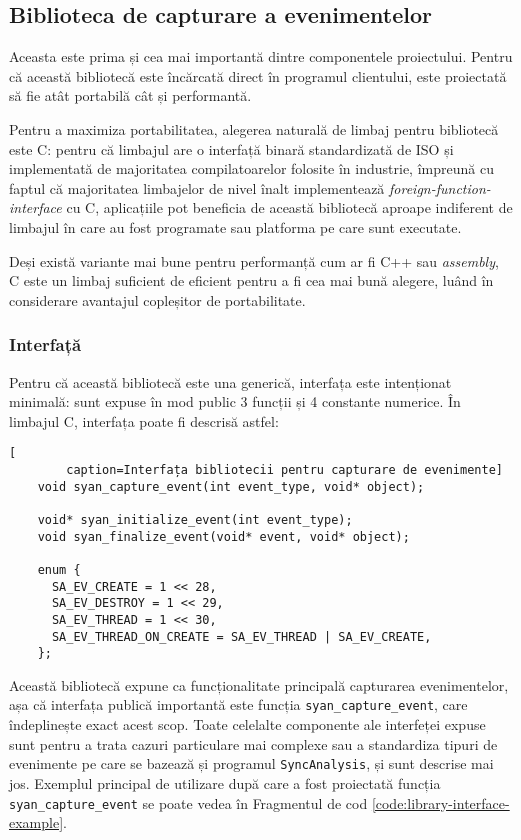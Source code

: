 \subsection{Biblioteca de capturare a evenimentelor}\label{library}
Aceasta este prima și cea mai importantă dintre componentele
proiectului. Pentru că această bibliotecă este încărcată direct în
programul clientului, este proiectată să fie atât portabilă cât și
performantă.

Pentru a maximiza portabilitatea, alegerea naturală de limbaj
pentru bibliotecă este C\cite{C}: pentru că limbajul are o interfață
binară standardizată de ISO și implementată de majoritatea
compilatoarelor folosite în industrie, împreună cu faptul că majoritatea
limbajelor de nivel înalt implementează
\textit{foreign-function-interface} cu C, aplicațiile pot beneficia de
această bibliotecă aproape indiferent de limbajul în care au fost
programate sau platforma pe care sunt executate.

Deși există variante mai bune pentru performanță cum ar fi C++ sau
\textit{assembly}, C este un limbaj suficient de eficient pentru a fi
cea mai bună alegere, luând în considerare avantajul copleșitor de
portabilitate.

\subsubsection{Interfață}\label{section:library-interface}
Pentru că această bibliotecă este una generică, interfața este
intenționat minimală: sunt expuse în mod public 3 funcții și 4
constante numerice. În limbajul C, interfața poate fi descrisă astfel:
\begin{lstlisting}[
        caption=Interfața bibliotecii pentru capturare de evenimente]
    void syan_capture_event(int event_type, void* object);

    void* syan_initialize_event(int event_type);
    void syan_finalize_event(void* event, void* object);

    enum {
      SA_EV_CREATE = 1 << 28,
      SA_EV_DESTROY = 1 << 29,
      SA_EV_THREAD = 1 << 30,
      SA_EV_THREAD_ON_CREATE = SA_EV_THREAD | SA_EV_CREATE,
    };
\end{lstlisting}
Această bibliotecă expune ca funcționalitate principală capturarea
evenimentelor, așa că interfața publică importantă este funcția
\lstinline{syan_capture_event}, care îndeplinește exact acest scop.
Toate celelalte componente ale interfeței expuse sunt pentru a trata
cazuri particulare mai complexe sau a standardiza tipuri de evenimente
pe care se bazează și programul \lstinline{SyncAnalysis}, și sunt
descrise mai jos. Exemplul principal de utilizare după care a fost
proiectată funcția \lstinline{syan_capture_event} se poate vedea în
Fragmentul de cod \ref{code:library-interface-example}.

